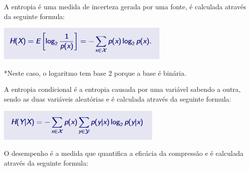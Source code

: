 \documentclass[12pt, a4paper]{article}
\begin{document}
\newpage

\bigskip
{}
\vspace{40px}

\begin{justify} \begin{large}
A entropia é uma medida de incerteza gerada por uma fonte, é calculada através da seguinte formula:
\end{large} \end{justify}

\bigskip
\includegraphics[scale=1]{entropy.png}

\begin{justify} \begin{large}
*Neste caso, o logaritmo tem base 2 porque a base é binária.
\end{large} \end{justify}
\vspace{20px}

\begin{justify} \begin{large}
A entropia condicional é a entropia causada por uma variável sabendo a outra, sendo as duas variáveis aleatórias e é calculada através da seguinte formula:
\end{large} \end{justify}

\bigskip
\includegraphics[scale=1]{conditionalentropy.png}
\vspace{50px}


\begin{justify} \begin{large}
O desempenho é a medida que quantifica a eficácia da compressão e é calculada através da seguinte formula:
\end{large} \end{justify}
\end{document}

